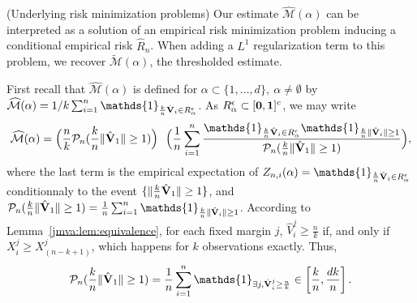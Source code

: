 \begin{remark}{(\sc Underlying risk minimization problems)}
\label{jmva:rk:optim}
Our estimate $\widehat{\mathcal{M}}(\alpha)$ can be interpreted as a solution of an empirical risk minimization problem inducing a conditional empirical risk $\widehat R_n$.
When adding a $L^1$ regularization term to this problem, we recover $\widetilde{\mathcal{M}}(\alpha)$, the thresholded estimate.

First recall that $\widehat{\mathcal{M}}(\alpha)$ is defined for $\alpha \subset \{1,\ldots,d\},~\alpha \neq \emptyset $ by $\widehat{\mathcal{M}}(\alpha) = 1/k \sum_{i=1}^{n} \mathds{1}_{\frac{k}{n} \hat{\mb V}_i \in R_\alpha^\epsilon}$. As $R_\alpha^\epsilon \subset [\mathbf 0, \mathbf 1]^c$, we may write
\begin{align*}
\widehat{\mathcal{M}}(\alpha) = \Big( \frac{n}{k} \mathcal{P}_n(\frac{k}{n} \| \hat{\mb V}_1 \| \ge 1) \Big) ~~ \Big( \frac{1}{n} \sum_{i=1}^n \frac{\mathds{1}_{\frac{k}{n} \hat{\mb V}_i \in R_\alpha^\epsilon} \mathds{1}_{\frac{k}{n} \| \hat{\mb V}_i \| \ge 1}}{ \mathcal{P}_n(\frac{k}{n} \| \hat{\mb V}_1 \| \ge 1)}\Big),
\end{align*}
where the last term is the empirical expectation of $Z_{n, i}(\alpha) = \mathds{1}_{\frac{k}{n} \hat{\mb V}_i \in R_\alpha^\epsilon}$ conditionnaly to the event $\{\|\frac{k}{n} \hat{\mathbf V}_1 \| \ge 1 \}$, and $\mathcal{P}_n(\frac{k}{n} \| \hat{\mb V}_1 \| \ge 1) = \frac{1}{n} \sum_{i=1}^n \mathds{1}_{\frac{k}{n} \|\hat{\mb V}_i\| \ge 1}$.
According to  Lemma~\ref{jmva:lem:equivalence}, for each fixed margin $j$, $\hat{V}_i^j  \ge \frac{n}{k}$ if, and only if $X_i^j \ge X_{(n-k+1)}^j$, which happens for $k$ observations exactly. Thus, $$\mathcal{P}_n(\frac{k}{n} \| \hat{\mb V}_1 \| \ge 1) = \frac{1}{n} \sum_{i=1}^n \mathds{1}_{\exists j,  \hat{\mb V}_i^j  \ge \frac{n}{k}} \in \left[\frac{k}{n}, \frac{dk}{n}\right].$$

\end{remark}
